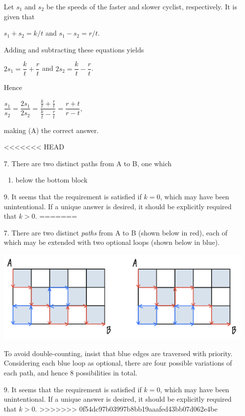 \documentclass[11pt,fleqn,dvipsnames,usenames]{article}
\begin{document}
\begin{enumerate}
Let $s_{1}$ and $s_{2}$ be the speeds of the faster and slower cyclist, respectively.  It is given that
\begin{center}
$s_{1} + s_{2} = k/t$ and $s_{1} - s_{2} = r/t$.
\end{center}
Adding and subtracting these equations yields
\begin{center}
$2s_{1} = \dfrac{k}{t} + \dfrac{r}{t}$ and $2s_{2} = \dfrac{k}{t} - \dfrac{r}{t}$.
\end{center}
Hence
\begin{center}
$\dfrac{s_{1}}{s_{2}} = \dfrac{2s_{1}}{2s_{2}} = \dfrac{\frac{k}{t} + \frac{r}{t}}{\frac{k}{t} - \frac{r}{t}} = \dfrac{r+t}{r-t}$,
\end{center}
making (A) the correct answer.

<<<<<<< HEAD
\item[7.] There are two distinct paths from A to B, one which 
\begin{enumerate}[(1)]
\item below the bottom block
\end{enumerate}
\item[9.] It seems that the requirement is satisfied if $k=0$, which may have been unintentional.  If a unique answer is desired, it should be explicitly required that $k>0$.
=======
\item[7.] There are two distinct \emph{paths} from A to B (shown below in red), each of which may be extended with two optional loops (shown below in blue).
\begin{center}
\includegraphics[width=0.8\linewidth]{routes}
\end{center}
To avoid double-counting, insist that blue edges are traversed with priority.  Considering each blue loop as optional, there are four possible variations of each path, and hence 8 possibilities in total.

\item[9.] \note It seems that the requirement is satisfied if $k=0$, which may have been unintentional.  If a unique answer is desired, it should be explicitly required that $k>0$.
>>>>>>> 0f54dc97b03997b8bb19aaafed43bb07d062e4be


\end{enumerate}
\end{document}
